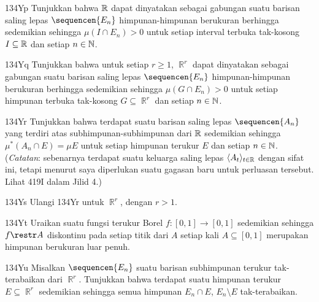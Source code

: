 {\spheader 134Yp Tunjukkan bahwa $\Bbb R$ dapat dinyatakan sebagai gabungan
suatu barisan saling lepas $\sequencen{E_n}$ himpunan-himpunan berukuran
berhingga sedemikian sehingga $\mu(I\cap E_n)>0$ untuk setiap interval
terbuka tak-kosong $I\subseteq\Bbb R$ dan setiap $n\in\Bbb N$.

\spheader 134Yq Tunjukkan bahwa untuk setiap $r\ge 1$, $\BbbR^r$ dapat
dinyatakan sebagai gabungan suatu barisan saling lepas $\sequencen{E_n}$
himpunan-himpunan berukuran berhingga sedemikian sehingga
$\mu(G\cap E_n)>0$ untuk setiap himpunan terbuka tak-kosong
$G\subseteq\BbbR^r$ dan setiap $n\in\Bbb N$.

\spheader 134Yr Tunjukkan bahwa terdapat suatu barisan saling lepas
$\sequencen{A_n}$ yang terdiri atas subhimpunan-subhimpunan dari $\Bbb R$
sedemikian sehingga
$\mu^*(A_n\cap E)=\mu E$ untuk setiap himpunan terukur $E$ dan setiap
$n\in\Bbb N$.
({\it Catatan\/}: sebenarnya terdapat suatu keluarga saling lepas
$\langle A_t\rangle_{t\in\Bbb R}$ dengan sifat ini, tetapi menurut saya
diperlukan suatu gagasan baru untuk perluasan tersebut. Lihat 419I dalam
Jilid 4.)

\spheader 134Ys Ulangi 134Yr untuk $\BbbR^r$, dengan $r>1$.

\spheader 134Yt Uraikan suatu fungsi terukur Borel
$f:[0,1]\to[0,1]$ sedemikian sehingga $f\restr A$ diskontinu pada setiap titik
dari $A$ setiap kali $A\subseteq[0,1]$ merupakan himpunan berukuran luar penuh.

\spheader 134Yu Misalkan $\sequencen{E_n}$ suatu barisan subhimpunan
terukur tak-terabaikan dari $\BbbR^r$. Tunjukkan bahwa terdapat suatu
himpunan terukur $E\subseteq\BbbR^r$ sedemikian sehingga semua himpunan
$E_n\cap E$, $E_n\setminus E$ tak-terabaikan.
}%

